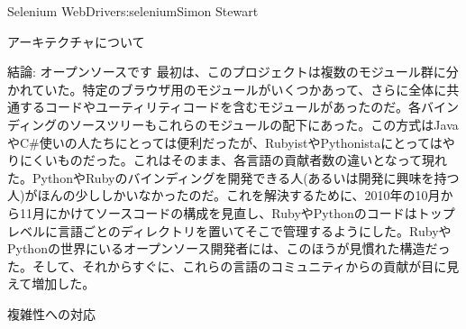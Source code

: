 \begin{aosachapter}{Selenium WebDriver}{s:selenium}{Simon Stewart}
\begin{aosasect1}{アーキテクチャについて}
\begin{aosasect2}{結論: オープンソースです}
最初は、このプロジェクトは複数のモジュール群に分かれていた。特定のブラウザ用のモジュールがいくつかあって、さらに全体に共通するコードやユーティリティコードを含むモジュールがあったのだ。各バインディングのソースツリーもこれらのモジュールの配下にあった。この方式はJavaやC\#使いの人たちにとっては便利だったが、RubyistやPythonistaにとってはやりにくいものだった。これはそのまま、各言語の貢献者数の違いとなって現れた。PythonやRubyのバインディングを開発できる人(あるいは開発に興味を持つ人)がほんの少ししかいなかったのだ。これを解決するために、2010年の10月から11月にかけてソースコードの構成を見直し、RubyやPythonのコードはトップレベルに言語ごとのディレクトリを置いてそこで管理するようにした。RubyやPythonの世界にいるオープンソース開発者には、このほうが見慣れた構造だった。そして、それからすぐに、これらの言語のコミュニティからの貢献が目に見えて増加した。

\end{aosasect2}

\end{aosasect1}

\begin{aosasect1}{複雑性への対応}


\end{aosasect1}
\end{aosachapter}
